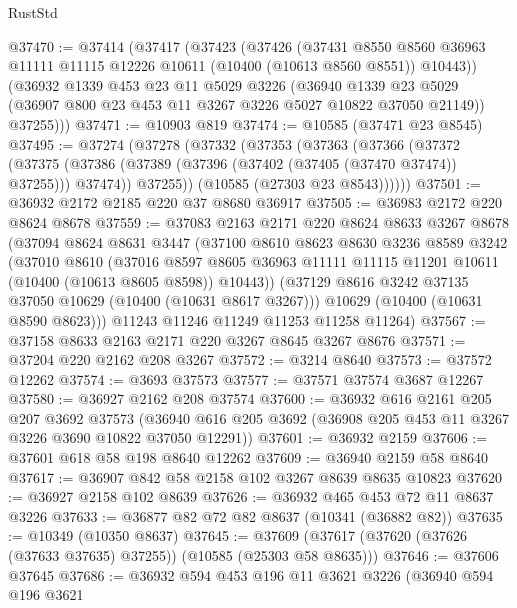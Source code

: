 \begin{lexlean}{RustStd}
\begin{coremodule}
@37470 := @37414
    (@37417
      (@37423
        (@37426
          (@37431
            @8550
            @8560
            @36963
            @11111
            @11115
            @12226
            @10611
            (@10400 (@10613 @8560 @8551))
            @10443))
        (@36932
          @1339
          @453
          @23
          @11
          @5029
          @3226
          (@36940 @1339 @23 @5029 (@36907 @800 @23 @453 @11 @3267 @3226 @5027 @10822 @37050 @21149))
          @37255)))
@37471 := @10903 @819
@37474 := @10585 (@37471 @23 @8545)
@37495 := @37274
    (@37278
      (@37332
        (@37353
          (@37363
            (@37366
              (@37372
                (@37375 (@37386 (@37389 (@37396 (@37402 (@37405 (@37470 @37474)) @37255))) @37474))
                @37255))
            (@10585 (@27303 @23 @8543))))))
@37501 := @36932 @2172 @2185 @220 @37 @8680 @36917
@37505 := @36983 @2172 @220 @8624 @8678
@37559 := @37083
    @2163
    @2171
    @220
    @8624
    @8633
    @3267
    @8678
    (@37094
      @8624
      @8631
      @3447
      (@37100
        @8610
        @8623
        @8630
        @3236
        @8589
        @3242
        (@37010
          @8610
          (@37016
            @8597
            @8605
            @36963
            @11111
            @11115
            @11201
            @10611
            (@10400 (@10613 @8605 @8598))
            @10443))
        (@37129 @8616 @3242 @37135 @37050 @10629 (@10400 (@10631 @8617 @3267)))
        @10629
        (@10400 (@10631 @8590 @8623)))
      @11243
      @11246
      @11249
      @11253
      @11258
      @11264)
@37567 := @37158 @8633 @2163 @2171 @220 @3267 @8645 @3267 @8676
@37571 := @37204 @220 @2162 @208 @3267
@37572 := @3214 @8640
@37573 := @37572 @12262
@37574 := @3693 @37573
@37577 := @37571 @37574 @3687 @12267
@37580 := @36927 @2162 @208 @37574
@37600 := @36932
    @616
    @2161
    @205
    @207
    @3692
    @37573
    (@36940 @616 @205 @3692 (@36908 @205 @453 @11 @3267 @3226 @3690 @10822 @37050 @12291))
@37601 := @36932 @2159
@37606 := @37601 @618 @58 @198 @8640 @12262
@37609 := @36940 @2159 @58 @8640
@37617 := @36907 @842 @58 @2158 @102 @3267 @8639 @8635 @10823
@37620 := @36927 @2158 @102 @8639
@37626 := @36932 @465 @453 @72 @11 @8637 @3226
@37633 := @36877 @82 @72 @82 @8637 (@10341 (@36882 @82))
@37635 := @10349 (@10350 @8637)
@37645 := @37609 (@37617 (@37620 (@37626 (@37633 @37635) @37255)) (@10585 (@25303 @58 @8635)))
@37646 := @37606 @37645
@37686 := @36932
    @594
    @453
    @196
    @11
    @3621
    @3226
    (@36940
      @594
      @196
      @3621

\end{coremodule}
\end{lexlean}
